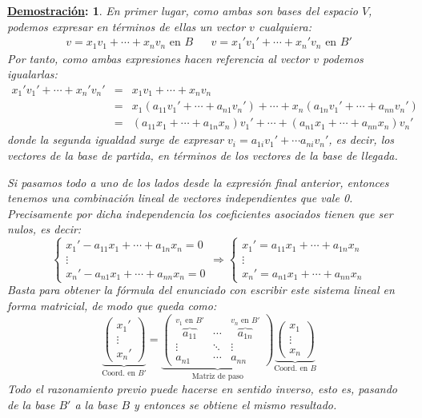 \documentclass[10pt,a4paper,openright]{book}
\theoremstyle{break}
\newtheorem*{demo}{\underline{Demostración}:}
\begin{document}
\begin{demo}
En primer lugar, como ambas son bases del espacio $V$, podemos expresar en términos de ellas un vector $v$ cualquiera:
\begin{align*}
v=x_1v_1+\cdots+x_nv_n  \mbox{ en } B && v=x_1'v_1'+\cdots+x_n'v_n  \mbox{ en } B'
\end{align*}
Por tanto, como ambas expresiones hacen referencia al vector $v$ podemos igualarlas:
\begin{eqnarray*}
x_1'v_1'+ \cdots + x_n'v_n'
&=& x_1v_1+\cdots + x_nv_n \\
&=& x_1(a_{11}v_1'+\cdots+a_{n1}v_n')+ \cdots + x_n(a_{1n}v_1'+\cdots+a_{nn}v_n') \\
&=& (a_{11}x_1+\cdots+a_{1n}x_n)v_1'+\cdots+(a_{n1}x_1+\cdots+a_{nn}x_n)v_n'
\end{eqnarray*}
donde la segunda igualdad surge de expresar $v_i = a_{1i}v_1' + \cdots a_{ni}v_n'$, es decir, los vectores de la base de partida, en términos de los vectores de la base de llegada.

Si pasamos todo a uno de los lados desde la expresión final anterior, entonces tenemos una combinación lineal de vectores independientes que vale 0. Precisamente por dicha independencia los coeficientes asociados tienen que ser nulos, es decir:
$$
\begin{cases}
x_1'-a_{11}x_1+\cdots+a_{1n}x_n = 0 \\
\vdots \\
x_n' - a_{n1}x_1+\cdots+a_{nn}x_n = 0 
\end{cases}
\Rightarrow
\begin{cases}
x_1'=a_{11}x_1+\cdots+a_{1n}x_n \\
\vdots \\
x_n'=a_{n1}x_1+\cdots+a_{nn}x_n 
\end{cases}
$$
Basta para obtener la fórmula del enunciado con escribir este sistema lineal en forma matricial, de modo que queda como:
$$
\underbrace{\left(\begin{array}{c} x_1'\\\vdots\\x_n'\end{array} \right)}_{\mbox{Coord. en } B'}=\underbrace{\left(\begin{array}{ccc}\overbrace{a_{11}}^{v_1\mbox{ en }B'}&\cdots&\overbrace{a_{1n}}^{v_n\mbox{ en }B'}\\\vdots&\ddots&\vdots\\a_{n1}&\cdots&a_{nn}\end{array}\right)}_{\mbox{Matriz de paso}}\underbrace{\left(\begin{array}{c}x_1\\\vdots\\x_n\end{array}\right)}_{\mbox{Coord. en } B}
$$
Todo el razonamiento previo puede hacerse en sentido inverso, esto es, pasando de la base $B'$ a la base $B$ y entonces se obtiene el mismo resultado.
\end{demo}
\end{document}
